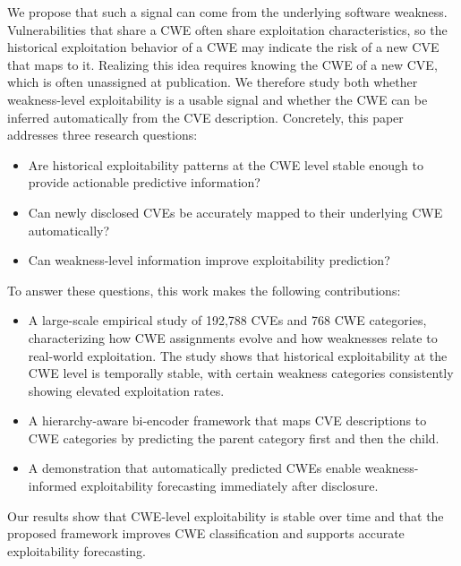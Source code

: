 \documentclass[conference,compsoc]{IEEEtran}
\begin{document}
We propose that such a signal can come from the underlying software weakness. Vulnerabilities that share a CWE often share exploitation characteristics, so the historical exploitation behavior of a CWE may indicate the risk of a new CVE that maps to it. Realizing this idea requires knowing the CWE of a new CVE, which is often unassigned at publication. We therefore study both whether weakness-level exploitability is a usable signal and whether the CWE can be inferred automatically from the CVE description. Concretely, this paper addresses three research questions:

\begin{itemize}
    \item[\textbf{RQ1:}] Are historical exploitability patterns at the CWE level stable enough to provide actionable predictive information?
    \item[\textbf{RQ2:}] Can newly disclosed CVEs be accurately mapped to their underlying CWE automatically?
    \item[\textbf{RQ3:}] Can weakness-level information improve exploitability prediction?
\end{itemize}

To answer these questions, this work makes the following contributions:
\begin{itemize}
    \item A large-scale empirical study of 192,788 CVEs and 768 CWE categories, characterizing how CWE assignments evolve and how weaknesses relate to real-world exploitation. The study shows that historical exploitability at the CWE level is temporally stable, with certain weakness categories consistently showing elevated exploitation rates.
    \item A hierarchy-aware bi-encoder framework that maps CVE descriptions to CWE categories by predicting the parent category first and then the child.
    \item A demonstration that automatically predicted CWEs enable weakness-informed exploitability forecasting immediately after disclosure.
\end{itemize}

Our results show that CWE-level exploitability is stable over time and that the proposed framework improves CWE classification and supports accurate exploitability forecasting.

\end{document}
